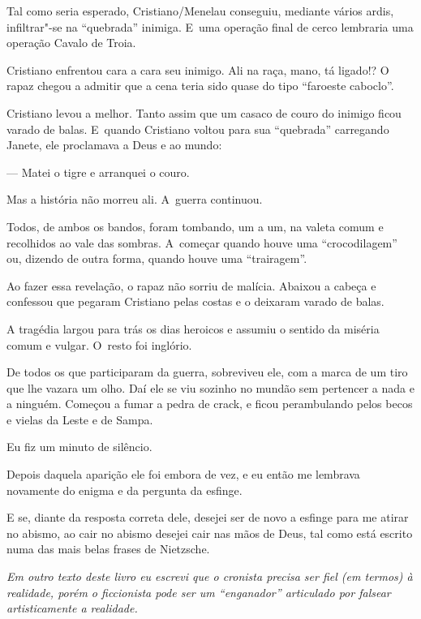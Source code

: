 Tal como seria esperado, Cristiano/Menelau conseguiu, mediante vários
ardis, infiltrar"-se na ``quebrada'' inimiga. E~uma operação final de
cerco lembraria uma operação Cavalo de Troia.

Cristiano enfrentou cara a cara seu inimigo. Ali na raça, mano, tá
ligado!? O rapaz chegou a admitir que a cena teria sido quase do tipo
``faroeste caboclo''.

Cristiano levou a melhor. Tanto assim que um casaco de couro do inimigo
ficou varado de balas. E~quando Cristiano voltou para sua ``quebrada''
carregando Janete, ele proclamava a Deus e ao mundo:

— Matei o tigre e arranquei o couro.

Mas a história não morreu ali. A~guerra continuou.

Todos, de ambos os bandos, foram tombando, um a um, na valeta comum e
recolhidos ao vale das sombras. A~começar quando houve uma
``crocodilagem'' ou, dizendo de outra forma, quando houve uma
``trairagem''.

Ao fazer essa revelação, o rapaz não sorriu de malícia. Abaixou a cabeça
e confessou que pegaram Cristiano pelas costas e o deixaram varado de
balas.

A tragédia largou para trás os dias heroicos e assumiu o sentido da
miséria comum e vulgar. O~resto foi inglório.

De todos os que participaram da guerra, sobreviveu ele, com a marca de um
tiro que lhe vazara um olho. Daí ele se viu sozinho no mundão sem
pertencer a nada e a ninguém. Começou a fumar a pedra de crack, e ficou
perambulando pelos becos e vielas da Leste e de Sampa.

Eu fiz um minuto de silêncio.

\asterisc{}

Depois daquela aparição ele foi embora de vez, e eu então me lembrava
novamente do enigma e da pergunta da esfinge.

E se, diante da resposta correta dele, desejei ser de novo a esfinge
para me atirar no abismo, ao cair no abismo desejei cair nas mãos de
Deus, tal como está escrito numa das mais belas frases de Nietzsche.

\begin{center}\asterisc{}\end{center}
\begingroup\small


\emph{Em outro texto deste livro eu escrevi que o cronista precisa ser
fiel (em termos) à realidade, porém o ficcionista pode ser um
``enganador'' articulado por falsear artisticamente a realidade.}

